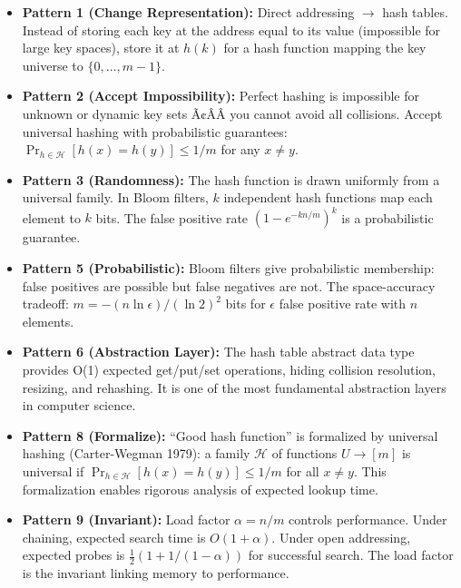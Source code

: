 \begin{itemize}
\item \textbf{Pattern 1 (Change Representation):} Direct addressing $\to$ hash tables. Instead of storing each key at the address equal to its value (impossible for large key spaces), store it at $h(k)$ for a hash function mapping the key universe to $\{0,\dots,m-1\}$.

\item \textbf{Pattern 2 (Accept Impossibility):} Perfect hashing is impossible for unknown or dynamic key sets Ã¢ÂÂ you cannot avoid all collisions. Accept universal hashing with probabilistic guarantees: $\Pr_{h \in \mathcal{H}}[h(x) = h(y)] \le 1/m$ for any $x \neq y$.

\item \textbf{Pattern 3 (Randomness):} The hash function is drawn uniformly from a universal family. In Bloom filters, $k$ independent hash functions map each element to $k$ bits. The false positive rate $(1 - e^{-kn/m})^k$ is a probabilistic guarantee.

\item \textbf{Pattern 5 (Probabilistic):} Bloom filters give probabilistic membership: false positives are possible but false negatives are not. The space-accuracy tradeoff: $m = -(n \ln \epsilon)/(\ln 2)^2$ bits for $\epsilon$ false positive rate with $n$ elements.

\item \textbf{Pattern 6 (Abstraction Layer):} The hash table abstract data type provides O(1) expected get/put/set operations, hiding collision resolution, resizing, and rehashing. It is one of the most fundamental abstraction layers in computer science.

\item \textbf{Pattern 8 (Formalize):} ``Good hash function'' is formalized by universal hashing (Carter-Wegman 1979): a family $\mathcal{H}$ of functions $U \to [m]$ is universal if $\Pr_{h \in \mathcal{H}}[h(x) = h(y)] \le 1/m$ for all $x \neq y$. This formalization enables rigorous analysis of expected lookup time.

\item \textbf{Pattern 9 (Invariant):} Load factor $\alpha = n/m$ controls performance. Under chaining, expected search time is $O(1 + \alpha)$. Under open addressing, expected probes is $\frac{1}{2}(1 + 1/(1-\alpha))$ for successful search. The load factor is the invariant linking memory to performance.
\end{itemize}

